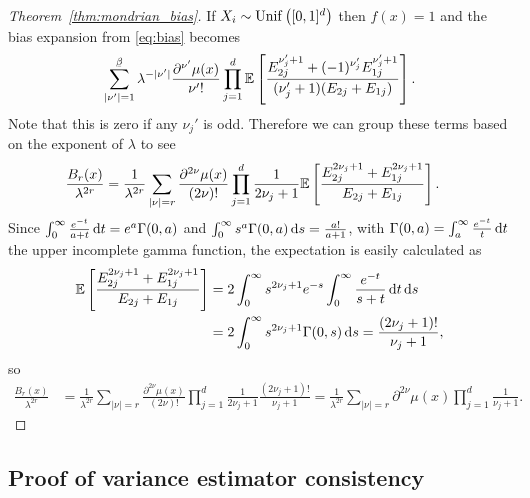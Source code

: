 \begin{proof}[Theorem~\ref{thm:mondrian_bias}]
  If $X_i \sim \operatorname{Unif}\big([0,1]^d\big)$ then $f(x) = 1$ and
  the bias expansion from \eqref{eq:bias} becomes
  \begin{align*}
    \sum_{|\nu'|=1}^{\flbeta}
    \lambda^{- |\nu'|}
    \frac{\partial^{\nu'} \mu(x)}{\nu' !}
    \prod_{j=1}^d
    \E \left[
      \frac{E_{2j}^{\nu'_j + 1}
      + (-1)^{\nu'_j} E_{1j}^{\nu'_j + 1}}
      {(\nu'_j + 1) (E_{2j} + E_{1j})}
    \right].
  \end{align*}
  Note that this is zero if any $\nu_j'$ is odd.
  Therefore we can group these terms based on the exponent of $\lambda$ to see
  \begin{align*}
    \frac{B_r(x)}{\lambda^{2r}}
    &=
    \frac{1}{\lambda^{2r}}
    \sum_{|\nu|=r}
    \frac{\partial^{2 \nu} \mu(x)}{(2 \nu) !}
    \prod_{j=1}^d
    \frac{1}{2\nu_j + 1}
    \mathbb{E} \left[
      \frac{E_{2j}^{2\nu_j + 1} + E_{1j}^{2\nu_j + 1}}
      {E_{2j} + E_{1j}}
    \right].
  \end{align*}
  Since $\int_0^\infty \frac{e^{-t}}{a+t} \,\mathrm{d}t = e^a \Gamma(0,a)$
  and $\int_0^\infty s^a \Gamma(0, a) \,\mathrm{d}s = \frac{a!}{a+1}$,
  with $\Gamma(0, a) = \int_a^\infty \frac{e^{-t}}{t} \,\mathrm{d}t$
  the upper incomplete gamma function,
  the expectation is easily calculated as
  \begin{align*}
    \mathbb{E} \left[
      \frac{E_{2j}^{2\nu_j + 1} + E_{1j}^{2\nu_j + 1}}
      {E_{2j} + E_{1j}}
    \right]
    &=
    2
    \int_{0}^{\infty}
    s^{2\nu_j + 1}
    e^{-s}
    \int_{0}^{\infty}
    \frac{e^{-t}}
    {s + t}
    \,\mathrm{d}t
    \,\mathrm{d}s \\
    &=
    2 \int_{0}^{\infty}
    s^{2\nu_j + 1}
    \Gamma(0, s)
    \,\mathrm{d}s
    =
    \frac{(2 \nu_j + 1)!}{\nu_j + 1},
  \end{align*}
  so
  \begin{align*}
    \frac{B_r(x)}{\lambda^{2r}}
    &=
    \frac{1}{\lambda^{2r}}
    \sum_{|\nu|=r}
    \frac{\partial^{2 \nu} \mu(x)}{(2 \nu) !}
    \prod_{j=1}^d
    \frac{1}{2\nu_j + 1}
    \frac{(2 \nu_j + 1)!}{\nu_j + 1}
    =
    \frac{1}{\lambda^{2r}}
    \sum_{|\nu|=r}
    \partial^{2 \nu} \mu(x)
    \prod_{j=1}^d
    \frac{1}{\nu_j + 1}.
  \end{align*}
\end{proof}

\subsection*{Proof of variance estimator consistency}

